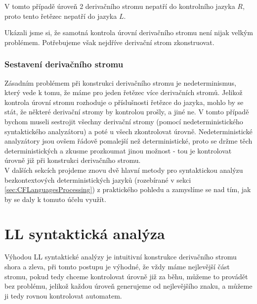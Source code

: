 \begin{exmp}
  \noindent
  V tomto případě úroveň 2 derivačního stromu nepatří do kontrolního jazyka $R$,
  proto tento řetězec nepatří do jazyka $L$.
\end{exmp}

Ukázali jsme si, že samotná kontrola úrovní derivačního stromu není nijak
velkým problémem. Potřebujeme však nejdříve derivační strom zkonstruovat.

\subsubsection*{Sestavení derivačního stromu}

Zásadním problémem při konstrukci derivačního stromu je nedeterminismus,
který vede k tomu, že máme pro jeden řetězec více derivačních stromů.
Jelikož kontrola úrovní stromu rozhoduje o příslušnosti řetězce do jazyka,
mohlo by se stát, že některé derivační stromy by kontrolou prošly, a jiné ne.
V tomto případě bychom museli sestrojit všechny derivační stromy (pomocí
nedeterministického syntaktického analyzátoru) a poté
u všech zkontrolovat úrovně. Nedeterministické analyzátory jsou ovšem řádově
pomalejší než deterministické, proto se držme těch deterministických a
zkusme prozkoumat jinou možnost - tou je kontrolovat úrovně již při konstrukci
derivačního stromu.\\

V dalších sekcích projdeme znovu dvě hlavní metody pro syntaktickou analýzu bezkontextových
deterministických jazyků (rozebírané v sekci \ref{sec:CFLanguagesProcessing})
z praktického pohledu a zamyslíme se nad tím, jak by se daly k tomuto účelu
využít.

\section{LL syntaktická analýza}
\label{sec:LLTreeLevelCheck}


Výhodou LL syntaktické analýzy je intuitivní konstrukce derivačního stromu shora a zleva,
při tomto postupu je výhodné, že vždy máme nejlevější část stromu, pokud tedy
chceme kontrolovat úrovně již za běhu, můžeme to provádět bez problému, jelikož
každou úroveň generujeme od nejlevějšího znaku, a můžeme ji tedy rovnou
kontrolovat automatem.\\

